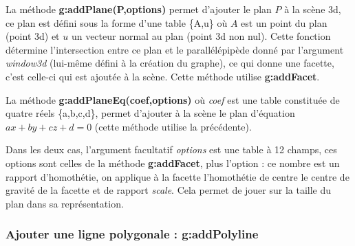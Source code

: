 La méthode \textbf{g:addPlane(P,options)} permet d'ajouter le plan $P$ à la scène 3d, ce plan est défini sous la forme d'une table \{A,u\} où $A$ est un point du plan (point 3d) et $u$ un vecteur normal au plan (point 3d non nul). Cette fonction détermine l'intersection entre ce plan et le parallélépipède donné par l'argument \emph{window3d} (lui-même défini à la création du graphe), ce qui donne une facette, c'est celle-ci qui est ajoutée à la scène. Cette méthode utilise \textbf{g:addFacet}.

La méthode \textbf{g:addPlaneEq(coef,options)} où \emph{coef} est une table constituée de quatre réels \{a,b,c,d\}, permet d'ajouter à la scène le plan d'équation $ax+by+cz+d=0$ (cette méthode utilise la précédente).

Dans les deux cas, l'argument facultatif \emph{options} est une table à 12 champs, ces options sont celles de la méthode \textbf{g:addFacet}, plus l'option  : ce nombre est un rapport d'homothétie, on applique à la facette l'homothétie de centre le centre de gravité de la facette et de rapport \emph{scale}. Cela permet de jouer sur la taille du plan dans sa représentation.
        

\subsubsection{Ajouter une ligne polygonale : g:addPolyline}

